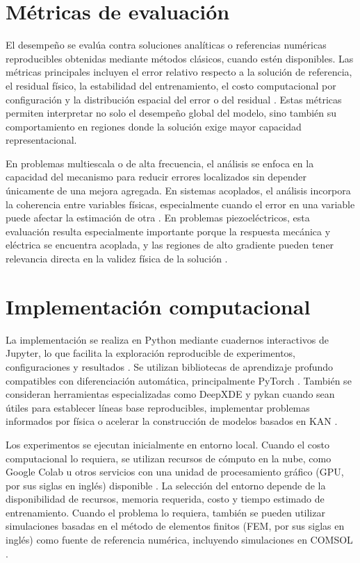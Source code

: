 \section{Métricas de evaluación}
\label{subsec:metricas}

El desempeño se evalúa contra soluciones analíticas o referencias numéricas reproducibles obtenidas mediante métodos clásicos, cuando estén disponibles. Las métricas principales incluyen el error relativo respecto a la solución de referencia, el residual físico, la estabilidad del entrenamiento, el costo computacional por configuración y la distribución espacial del error o del residual \cite{grossmann2024,shukla2024fair,wang2025kinn}. Estas métricas permiten interpretar no solo el desempeño global del modelo, sino también su comportamiento en regiones donde la solución exige mayor capacidad representacional.

En problemas multiescala o de alta frecuencia, el análisis se enfoca en la capacidad del mecanismo para reducir errores localizados sin depender únicamente de una mejora agregada. En sistemas acoplados, el análisis incorpora la coherencia entre variables físicas, especialmente cuando el error en una variable puede afectar la estimación de otra \cite{tandis2025piezoelectric,mouratidou2026shunted}. En problemas piezoeléctricos, esta evaluación resulta especialmente importante porque la respuesta mecánica y eléctrica se encuentra acoplada, y las regiones de alto gradiente pueden tener relevancia directa en la validez física de la solución \cite{wang2004intensity,mouratidou2026shunted}.

\section{Implementación computacional}
\label{subsec:implementacion}

La implementación se realiza en Python mediante cuadernos interactivos de Jupyter, lo que facilita la exploración reproducible de experimentos, configuraciones y resultados \cite{vanrossum2009python,kluyver2016jupyter}. Se utilizan bibliotecas de aprendizaje profundo compatibles con diferenciación automática, principalmente PyTorch \cite{paszke2019pytorch}. También se consideran herramientas especializadas como DeepXDE y pykan cuando sean útiles para establecer líneas base reproducibles, implementar problemas informados por física o acelerar la construcción de modelos basados en KAN \cite{lu2021deepxde,liu2024kan}.

Los experimentos se ejecutan inicialmente en entorno local. Cuando el costo computacional lo requiera, se utilizan recursos de cómputo en la nube, como Google Colab u otros servicios con una unidad de procesamiento gráfico (GPU, por sus siglas en inglés) disponible \cite{bisong2019colab}. La selección del entorno depende de la disponibilidad de recursos, memoria requerida, costo y tiempo estimado de entrenamiento. Cuando el problema lo requiera, también se pueden utilizar simulaciones basadas en el método de elementos finitos (FEM, por sus siglas en inglés) como fuente de referencia numérica, incluyendo simulaciones en COMSOL \cite{comsol2024manual}.

